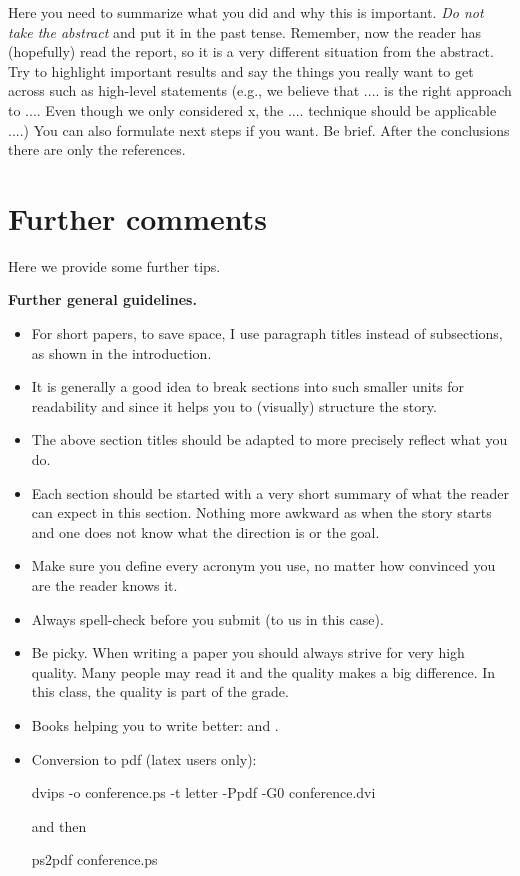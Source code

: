 \documentclass[letterpaper]{article}
\newcommand{\mypar}[1]{{\bf #1.}}
\begin{document}
Here you need to summarize what you did and why this is
important. {\em Do not take the abstract} and put it in the past
tense. Remember, now the reader has (hopefully) read the report, so it
is a very different situation from the abstract. Try to highlight
important results and say the things you really want to get across
such as high-level statements (e.g., we believe that .... is the right
approach to .... Even though we only considered x, the
.... technique should be applicable ....) You can also formulate next
steps if you want. Be brief. After the conclusions there are only the references.

\section{Further comments}

Here we provide some further tips.

\mypar{Further general guidelines}

\begin{itemize}
\item For short papers, to save space, I use paragraph titles instead of
subsections, as shown in the introduction.

\item It is generally a good idea to break sections into such smaller
units for readability and since it helps you to (visually) structure the story.

\item The above section titles should be adapted to more precisely
reflect what you do.

\item Each section should be started with a very
short summary of what the reader can expect in this section. Nothing
more awkward as when the story starts and one does not know what the
direction is or the goal.

\item Make sure you define every acronym you use, no matter how
convinced you are the reader knows it.

\item Always spell-check before you submit (to us in this case).

\item Be picky. When writing a paper you should always strive for very
high quality. Many people may read it and the quality makes a big difference.
In this class, the quality is part of the grade.

\item Books helping you to write better: \cite{Higham:98} and \cite{Strunk:00}.

\item Conversion to pdf (latex users only): 

dvips -o conference.ps -t letter -Ppdf -G0 conference.dvi

and then

ps2pdf conference.ps
\end{itemize}
\end{document}
